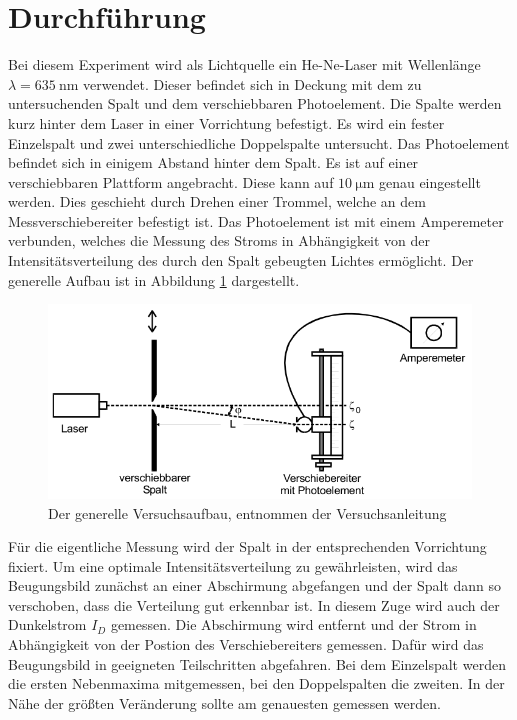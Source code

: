 \section{Durchführung}
\label{sec:Durchführung}

Bei diesem Experiment wird als Lichtquelle ein He-Ne-Laser mit Wellenlänge $\lambda = \SI{635}{\nano\metre}$ verwendet.
Dieser befindet sich in Deckung mit dem zu untersuchenden Spalt und dem verschiebbaren Photoelement.
Die Spalte werden kurz hinter dem Laser in einer Vorrichtung befestigt.
Es wird ein fester Einzelspalt und zwei unterschiedliche Doppelspalte untersucht.
Das Photoelement befindet sich in einigem Abstand hinter dem Spalt.
Es ist auf einer verschiebbaren Plattform angebracht.
Diese kann auf $\SI{10}{\micro\metre}$ genau eingestellt werden.
Dies geschieht durch Drehen einer Trommel, welche an dem Messverschiebereiter befestigt ist.
Das Photoelement ist mit einem Amperemeter verbunden, welches die Messung des Stroms in Abhängigkeit von der Intensitätsverteilung des durch den Spalt gebeugten Lichtes ermöglicht.
Der generelle Aufbau ist in Abbildung \ref{fig:Aufbau} dargestellt.

\begin{figure}
  \centering
  \includegraphics[scale=0.7]{images/Aufbau.png}
  \caption{Der generelle Versuchsaufbau, entnommen der Versuchsanleitung \cite[36]{1}}
  \label{fig:Aufbau}
\end{figure}

Für die eigentliche Messung wird der Spalt in der entsprechenden Vorrichtung fixiert.
Um eine optimale Intensitätsverteilung zu gewährleisten, wird das Beugungsbild zunächst an einer Abschirmung abgefangen und der Spalt dann so verschoben, dass die Verteilung gut erkennbar ist.
In diesem Zuge wird auch der Dunkelstrom $I_D$ gemessen.
Die Abschirmung wird entfernt und der Strom in Abhängigkeit von der Postion des Verschiebereiters gemessen.
Dafür wird das Beugungsbild in geeigneten Teilschritten abgefahren.
Bei dem Einzelspalt werden die ersten Nebenmaxima mitgemessen, bei den Doppelspalten die zweiten.
In der Nähe der größten Veränderung sollte am genauesten gemessen werden.
